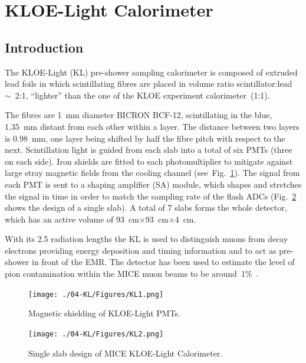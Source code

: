 \graphicspath{{04-KL/Figures/}}

\section{KLOE-Light Calorimeter}
\label{Sect:KL}

\subsection{Introduction}
\label{SubSect:KL_Intro}

The KLOE-Light (KL) pre-shower sampling calorimeter is composed of extruded lead foils in which scintillating
fibres are placed in volume ratio scintillator:lead~$\sim$~2:1, ``lighter'' than the one of the KLOE experiment calorimeter~(1:1).

The fibres are 1~mm diameter BICRON BCF-12, scintillating in the blue, 1.35~mm distant from each other within a layer. The distance between two layers is 0.98~mm, one layer being shifted by half the fibre pitch with respect to the next.
Scintillation light is guided from each slab into a total of six PMTs (three on each side). Iron shields are fitted to each photomultiplier to
mitigate against large stray magnetic fields from the cooling channel (see~Fig.~\ref{fig:KL1}). The signal from each PMT is sent to a shaping amplifier (SA) module, which shapes and stretches the signal in time in order to match the sampling rate of the flash ADCs (Fig.~\ref{fig:KL2} shows the design of a single slab).
A total of 7 slabs forms the whole detector, which has an active volume of 93~cm$\times$93~cm$\times$4~cm.

With its 2.5 radiation lengths the KL is used to distinguish muons from decay electrons providing energy deposition and timing information and to act as pre-shower in front of the EMR.
The detector has been used to estimate the level of pion contamination within the MICE muon beams to be around~1\%~\cite{2016JInst..11P3001A}.
\begin{figure}
  \begin{center}
    \texttt{[image: ./04-KL/Figures/KL1.png]}
    \caption{Magnetic shielding of KLOE-Light PMTs.}
    \label{fig:KL1}
  \end{center}
\end{figure}
\begin{figure}
  \begin{center}
    \texttt{[image: ./04-KL/Figures/KL2.png]}
    \caption{Single slab design of MICE KLOE-Light Calorimeter.}
    \label{fig:KL2}
  \end{center}
\end{figure}



